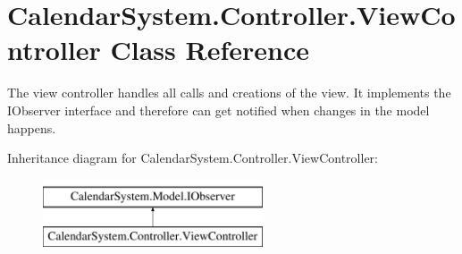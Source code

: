 \hypertarget{class_calendar_system_1_1_controller_1_1_view_controller}{\section{Calendar\+System.\+Controller.\+View\+Controller Class Reference}
\label{class_calendar_system_1_1_controller_1_1_view_controller}
}


The view controller handles all calls and creations of the view. It implements the I\+Observer interface and therefore can get notified when changes in the model happens.  


Inheritance diagram for Calendar\+System.\+Controller.\+View\+Controller\+:\begin{figure}[H]
\begin{center}
\leavevmode
\includegraphics[height=2.000000cm]{class_calendar_system_1_1_controller_1_1_view_controller}
\end{center}
\end{figure}
